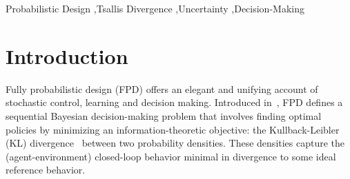 \documentclass[a4paper,fleqn]{cas-sc}
\begin{document}
\begin{keywords}
Probabilistic Design \sep Tsallis Divergence \sep Uncertainty \sep Decision-Making
\end{keywords}


\maketitle

\section{Introduction}

Fully probabilistic design (FPD) offers an elegant and unifying account of stochastic control, learning and decision making. Introduced in~\cite{karny1996towards}, FPD defines a sequential Bayesian decision-making problem that involves finding optimal policies by minimizing an information-theoretic objective: the Kullback-Leibler (KL) divergence~\cite{SK_RL:51} between two probability densities. These densities capture the (agent-environment) closed-loop behavior minimal in divergence to some ideal reference behavior. 
\end{document}
